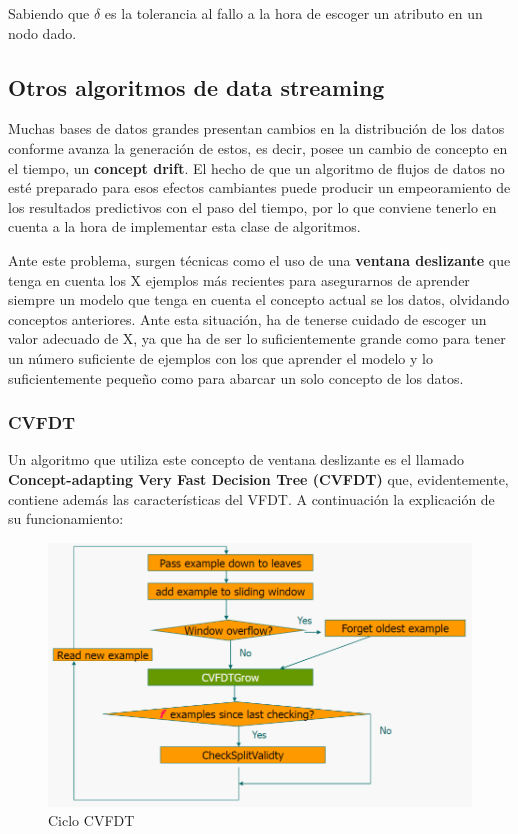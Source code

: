 Sabiendo que $\delta$ es la tolerancia al fallo a la hora de escoger un atributo en un nodo dado.

\subsection{Otros algoritmos de data streaming}

Muchas bases de datos grandes presentan cambios en la distribución de los datos conforme avanza la generación de estos, es decir, posee un cambio de concepto en el tiempo, un \textbf{concept drift}. El hecho de que un algoritmo de flujos de datos no esté preparado para esos efectos cambiantes puede producir un empeoramiento de los resultados predictivos con el paso del tiempo, por lo que conviene tenerlo en cuenta a la hora de implementar esta clase de algoritmos.

Ante este problema, surgen técnicas como el uso de una \textbf{ventana deslizante} que tenga en cuenta los X ejemplos más recientes para asegurarnos de aprender siempre un modelo que tenga en cuenta el concepto actual se los datos, olvidando conceptos anteriores. Ante esta situación, ha de tenerse cuidado de escoger un valor adecuado de X, ya que ha de ser lo suficientemente grande como para tener un número suficiente de ejemplos con los que aprender el modelo y lo suficientemente pequeño como para abarcar un solo concepto de los datos.

\subsubsection{CVFDT}

Un algoritmo que utiliza este concepto de ventana deslizante es el llamado\textbf{ Concept-adapting Very Fast Decision Tree (CVFDT)} que, evidentemente, contiene además las características del VFDT. A continuación la explicación de su funcionamiento\cite{ref12}:

\begin{figure}[H]
	\centering
	\includegraphics[width=1\textwidth]{imagenes/cvfdt} 
	\caption{Ciclo CVFDT \cite{ref11}}
\end{figure}

